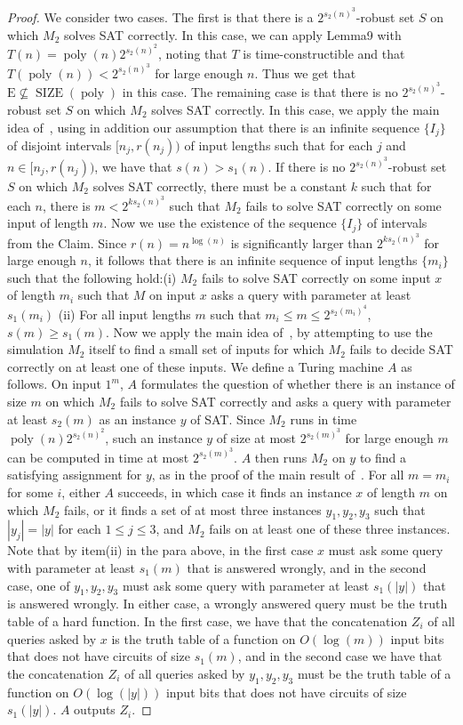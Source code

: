 \documentclass[10pt,a4paper]{article}
\newcommand{\SIZE}{\operatorname{SIZE}}
\newcommand{\poly}{\operatorname{poly}}
\begin{document}
\begin{proof}
We consider two cases. The first is that there is a $2^{s_2(n)^3}$-robust set $S$ on which $M_2$ solves SAT correctly. In this case, we can apply Lemma9 with $T(n)=\poly(n)2^{s_2(n)^2}$, noting that $T$ is time-constructible and that $T(\poly(n))<2^{s_2(n)^3}$ for large enough $n$. Thus we get that $\mathrm E\not\subseteq\SIZE(\poly)$ in this case.
The remaining case is that there is no $2^{s_2(n)^3}$-robust set $S$ on which $M_2$ solves SAT correctly. In this case, we apply the main idea of~\cite{ref12}, using in addition our assumption that there is an infinite sequence $\{I_j\}$ of disjoint intervals $[n_j,r(n_j))$ of input lengths such that for each $j$ and $n\in[n_j,r(n_j))$, we have that $s(n)>s_1(n)$.
If there is no $2^{s_2(n)^3}$-robust set $S$ on which $M_2$ solves SAT correctly, there must be a constant $k$ such that for each $n$, there is $m<2^{ks_2(n)^3}$ such that $M_2$ fails to solve SAT correctly on some input of length $m$. Now we use the existence of the sequence $\{I_j\}$ of intervals from the Claim. Since $r(n)=n^{\log(n)}$ is significantly larger than $2^{ks_2(n)^3}$ for large enough $n$, it follows that there is an infinite sequence of input lengths $\{m_i\}$ such that the following hold:(i) $M_2$ fails to solve SAT correctly on some input $x$ of length $m_i$ such that $M$ on input $x$ asks a query with parameter at least $s_1(m_i)$ (ii) For all input lengths $m$ such that $m_i\leq m\leq2^{s_2(m_i)^4}$, $s(m)\geq s_1(m)$.
Now we apply the main idea of~\cite{ref12}, by attempting to use the simulation $M_2$ itself to find a small set of inputs for which $M_2$ fails to decide SAT correctly on at least one of these inputs. We define a Turing machine $A$ as follows. On input $1^m$, $A$ formulates the question of whether there is an instance of size $m$ on which $M_2$ fails to solve SAT correctly and asks a query with parameter at least $s_2(m)$ as an instance $y$ of SAT. Since $M_2$ runs in time $\poly(n)2^{s_2(n)^2}$, such an instance $y$ of size at most $2^{s_2(m)^3}$ for large enough $m$ can be computed in time at most $2^{s_2(m)^3}$. $A$ then runs $M_2$ on $y$ to find a satisfying assignment for $y$, as in the proof of the main result of~\cite{ref12}. For all $m=m_i$ for some $i$, either $A$ succeeds, in which case it finds an instance $x$ of length $m$ on which $M_2$ fails, or it finds a set of at most three instances $y_1,y_2,y_3$ such that $|y_j|=|y|$ for each $1\leq j\leq3$, and $M_2$ fails on at least one of these three instances. Note that by item(ii) in the para above, in the first case $x$ must ask some query with parameter at least $s_1(m)$ that is answered wrongly, and in the second case, one of $y_1,y_2,y_3$ must ask some query with parameter at least $s_1(|y|)$ that is answered wrongly. In either case, a wrongly answered query must be the truth table of a hard function. In the first case, we have that the concatenation $Z_i$ of all queries asked by $x$ is the truth table of a function on $O(\log(m))$ input bits that does not have circuits of size $s_1(m)$, and in the second case we have that the concatenation $Z_i$ of all queries asked by $y_1,y_2,y_3$ must be the truth table of a function on $O(\log(|y|))$ input bits that does not have circuits of size $s_1(|y|)$. $A$ outputs $Z_i$.

\end{proof}
\end{document}
